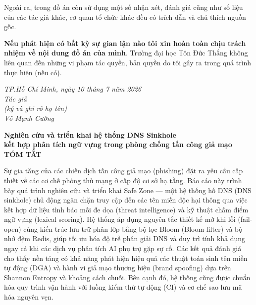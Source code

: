 \documentclass[13pt,a4paper]{extreport}
\begin{document}
Ngoài ra, trong đồ án còn sử dụng một số nhận xét, đánh giá cũng như số liệu của các tác giả khác, cơ quan tổ chức khác đều có trích dẫn và chú thích nguồn gốc.

\textbf{Nếu phát hiện có bất kỳ sự gian lận nào tôi xin hoàn toàn chịu trách nhiệm về nội dung đồ án của mình}. Trường đại học Tôn Đức Thắng không liên quan đến những vi phạm tác quyền, bản quyền do tôi gây ra trong quá trình thực hiện (nếu có).
\begin{center}
    \textit{
        \hspace*{5cm}TP.Hồ Chí Minh, ngày 10 tháng 7 năm 2026 \\
    	\hspace*{5cm}Tác giả\\
    	\hspace*{5cm}(ký và ghi rõ họ tên)\\
    	\vspace*{0.2cm}
    	\vspace*{2cm}
    	\hspace*{5cm}Võ Mạnh Cường\\
        \vspace*{0.2cm}
    }
\end{center}
\newpage

\begin{center}\fontsize{16pt}{18pt}
    \textbf{Nghiên cứu và triển khai hệ thống DNS Sinkhole \\ kết hợp phân tích ngữ vựng trong phòng chống tấn công giả mạo\\}
    \textbf{TÓM TẮT}
\end{center}

Sự gia tăng của các chiến dịch tấn công giả mạo (phishing) đặt ra yêu cầu cấp thiết về các cơ chế phòng thủ mạng ở cấp độ cơ sở hạ tầng. Báo cáo này trình bày quá trình nghiên cứu và triển khai Safe Zone --- một hệ thống hố DNS (DNS sinkhole) chủ động ngăn chặn truy cập đến các tên miền độc hại thông qua việc kết hợp dữ liệu tình báo mối đe dọa (threat intelligence) và kỹ thuật chấm điểm ngữ vựng (lexical scoring). Hệ thống áp dụng nguyên tắc thiết kế mở khi lỗi (fail-open) cùng kiến trúc lưu trữ phân lớp bằng bộ lọc Bloom (Bloom filter) và bộ nhớ đệm Redis, giúp tối ưu hóa độ trễ phân giải DNS và duy trì tính khả dụng ngay cả khi các dịch vụ phân tích AI phụ trợ gặp sự cố. Các kết quả đánh giá cho thấy nền tảng có khả năng phát hiện hiệu quả các thuật toán sinh tên miền tự động (DGA) và hành vi giả mạo thương hiệu (brand spoofing) dựa trên Shannon Entropy và khoảng cách chuỗi. Bên cạnh đó, hệ thống cũng được chuẩn hóa quy trình vận hành với luồng kiểm thử tự động (CI) và cơ chế sao lưu mã hóa nguyên vẹn.
\end{document}
